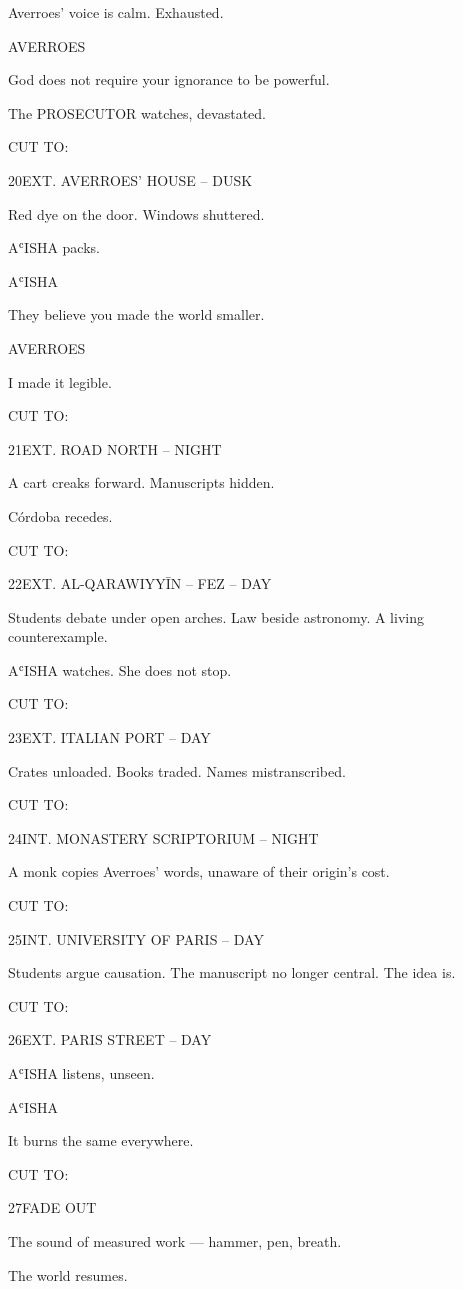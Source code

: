 \documentclass[12pt]{article}
\newlength{\charindent}
\newlength{\dialogueindent}
\newlength{\dialoguewidth}
\newlength{\transitionindent}
\newcommand{\slug}[1]{%
  \needspace{4\baselineskip}%
  \vspace{1.5em}%
  \noindent\MakeUppercase{#1}%
  \nopagebreak[4]%
  \par\vspace{0.75em}%
}
\newcommand{\action}[1]{%
  \noindent#1\par\vspace{0.75em}%
}
\newcommand{\character}[1]{%
  \needspace{3\baselineskip}%
  \par\vspace{0.5em}%
  \noindent\hspace*{\charindent}\MakeUppercase{#1}\nopagebreak[4]%
}
\newcommand{\dialogue}[1]{%
  \par\nobreak\nopagebreak[4]%
  \noindent\hspace*{\dialogueindent}%
  \begin{minipage}[t]{\dialoguewidth}
  #1
  \end{minipage}%
  \par\vspace{0.5em}%
}
\newcommand{\transition}[1]{%
  \needspace{2\baselineskip}%
  \par\vspace{1em}%
  \noindent\hspace*{\transitionindent}\MakeUppercase{#1}%
  \par%
}
\begin{document}
\action{Averroes’ voice is calm. Exhausted.}

\character{AVERROES}
\dialogue{God does not require your ignorance to be powerful.}

\action{The PROSECUTOR watches, devastated.}

\transition{CUT TO:}

\slug{20\quad EXT. AVERROES' HOUSE -- DUSK}

\action{Red dye on the door. Windows shuttered.}

\action{AʿISHA packs.}

\character{AʿISHA}
\dialogue{They believe you made the world smaller.}

\character{AVERROES}
\dialogue{I made it legible.}

\transition{CUT TO:}

\slug{21\quad EXT. ROAD NORTH -- NIGHT}

\action{A cart creaks forward. Manuscripts hidden.}

\action{Córdoba recedes.}

\transition{CUT TO:}

\slug{22\quad EXT. AL-QARAWIYY\={I}N -- FEZ -- DAY}

\action{Students debate under open arches. Law beside astronomy. A living counterexample.}

\action{AʿISHA watches. She does not stop.}

\transition{CUT TO:}

\slug{23\quad EXT. ITALIAN PORT -- DAY}

\action{Crates unloaded. Books traded. Names mistranscribed.}

\transition{CUT TO:}

\slug{24\quad INT. MONASTERY SCRIPTORIUM -- NIGHT}

\action{A monk copies Averroes’ words, unaware of their origin’s cost.}

\transition{CUT TO:}

\slug{25\quad INT. UNIVERSITY OF PARIS -- DAY}

\action{Students argue causation. The manuscript no longer central. The idea is.}

\transition{CUT TO:}

\slug{26\quad EXT. PARIS STREET -- DAY}

\action{AʿISHA listens, unseen.}

\character{AʿISHA}
\dialogue{It burns the same everywhere.}

\transition{CUT TO:}

\slug{27\quad FADE OUT}

\action{The sound of measured work — hammer, pen, breath.}

\action{The world resumes.}
\end{document}

